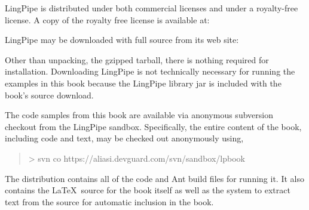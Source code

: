 \noindent
LingPipe is distributed under both commercial licenses
and under a royalty-free license.  A copy of the royalty free
license is available at:
%
\begin{quote}
\end{quote}

LingPipe may be downloaded with full source from its web site:
%
\begin{quote}
\end{quote}
%
Other than unpacking, the gzipped tarball, there is nothing required
for installation.  Downloading LingPipe is not technically necessary for
running the examples in this book because the LingPipe library jar is
included with the book's source download.



\noindent
The code samples from this book are available via anonymous subversion checkout
from the LingPipe sandbox.  Specifically, the entire content of the book,
including code and text, may be checked out anonymously using,

\begin{quote}
{\small\ttfamily
> svn co https://aliasi.devguard.com/svn/sandbox/lpbook
}
\end{quote}
%
The distribution contains all of the code and Ant build files for
running it.  It also contains the \LaTeX\ source for the book itself
as well as the system to extract text from the source for automatic
inclusion in the book.










